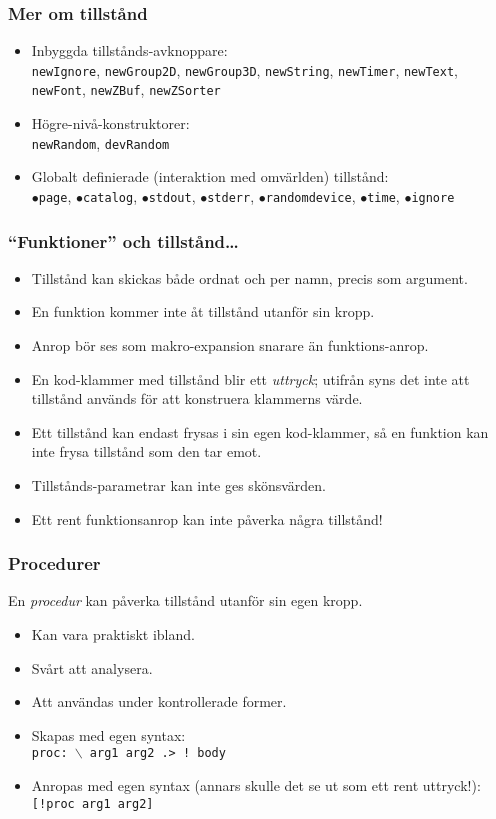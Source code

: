 \documentclass[noamsthm,handout]{beamer}
\begin{document}
\begin{frame}\frametitle{Mer om tillstånd}
  \begin{itemize}
  \item Inbyggda tillstånds-avknoppare:\\
    \texttt{newIgnore}, \texttt{newGroup2D}, \texttt{newGroup3D}, \texttt{newString}, \texttt{newTimer}, \texttt{newText}, \texttt{newFont}, \texttt{newZBuf}, \texttt{newZSorter}
  \item Högre-nivå-konstruktorer:\\
    \texttt{newRandom}, \texttt{devRandom}
  \item Globalt definierade (interaktion med omvärlden) tillstånd:\\
    \texttt{$\bullet$page}, \texttt{$\bullet$catalog}, \texttt{$\bullet$stdout}, \texttt{$\bullet$stderr}, \texttt{$\bullet$randomdevice}, \texttt{$\bullet$time}, \texttt{$\bullet$ignore}
  \end{itemize}
\end{frame}

\begin{frame}\frametitle{``Funktioner'' och tillstånd\ldots}
  \begin{itemize}
  \item Tillstånd kan skickas både ordnat och per namn, precis som argument.
  \item En funktion kommer inte åt tillstånd utanför sin kropp.
  \item Anrop bör ses som makro-expansion snarare än funktions-anrop.
  \item En kod-klammer med tillstånd blir ett \emph{uttryck}; utifrån syns det inte att tillstånd används för att konstruera klammerns värde.
  \item Ett tillstånd kan endast frysas i sin egen kod-klammer, så en funktion kan inte frysa tillstånd som den tar emot.
  \item Tillstånds-parametrar kan inte ges skönsvärden.
  \item Ett rent funktionsanrop kan inte påverka några tillstånd!
  \end{itemize}
\end{frame}

\begin{frame}\frametitle{Procedurer}
  En \emph{procedur} kan påverka tillstånd utanför sin egen kropp.

  \begin{itemize}
  \item Kan vara praktiskt ibland.
  \item Svårt att analysera.
  \item Att användas under kontrollerade former.
  \item Skapas med egen syntax:\\
    \texttt{proc: {\color{red}$\backslash$} arg1 arg2 {\color{red}.> !} body}
  \item Anropas med egen syntax (annars skulle det se ut som ett rent uttryck!):\\
    \texttt{{\color{red}[!}proc arg1 arg2{\color{red}]}}
  \end{itemize}
\end{frame}
\end{document}
